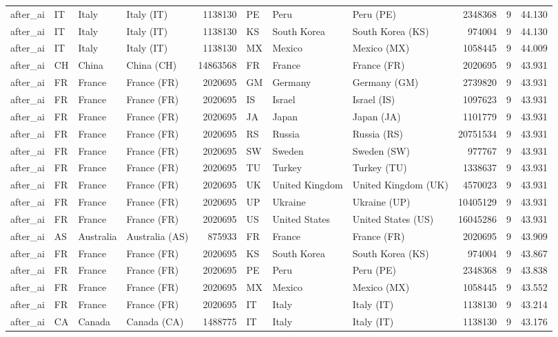 \begin{tabular}{llllrlllrrr}
after\_ai & IT & Italy & Italy (IT) & 1138130 & PE & Peru & Peru (PE) & 2348368 & 9 & 44.130 \\
after\_ai & IT & Italy & Italy (IT) & 1138130 & KS & South Korea & South Korea (KS) & 974004 & 9 & 44.130 \\
after\_ai & IT & Italy & Italy (IT) & 1138130 & MX & Mexico & Mexico (MX) & 1058445 & 9 & 44.009 \\
after\_ai & CH & China & China (CH) & 14863568 & FR & France & France (FR) & 2020695 & 9 & 43.931 \\
after\_ai & FR & France & France (FR) & 2020695 & GM & Germany & Germany (GM) & 2739820 & 9 & 43.931 \\
after\_ai & FR & France & France (FR) & 2020695 & IS & Israel & Israel (IS) & 1097623 & 9 & 43.931 \\
after\_ai & FR & France & France (FR) & 2020695 & JA & Japan & Japan (JA) & 1101779 & 9 & 43.931 \\
after\_ai & FR & France & France (FR) & 2020695 & RS & Russia & Russia (RS) & 20751534 & 9 & 43.931 \\
after\_ai & FR & France & France (FR) & 2020695 & SW & Sweden & Sweden (SW) & 977767 & 9 & 43.931 \\
after\_ai & FR & France & France (FR) & 2020695 & TU & Turkey & Turkey (TU) & 1338637 & 9 & 43.931 \\
after\_ai & FR & France & France (FR) & 2020695 & UK & United Kingdom & United Kingdom (UK) & 4570023 & 9 & 43.931 \\
after\_ai & FR & France & France (FR) & 2020695 & UP & Ukraine & Ukraine (UP) & 10405129 & 9 & 43.931 \\
after\_ai & FR & France & France (FR) & 2020695 & US & United States & United States (US) & 16045286 & 9 & 43.931 \\
after\_ai & AS & Australia & Australia (AS) & 875933 & FR & France & France (FR) & 2020695 & 9 & 43.909 \\
after\_ai & FR & France & France (FR) & 2020695 & KS & South Korea & South Korea (KS) & 974004 & 9 & 43.867 \\
after\_ai & FR & France & France (FR) & 2020695 & PE & Peru & Peru (PE) & 2348368 & 9 & 43.838 \\
after\_ai & FR & France & France (FR) & 2020695 & MX & Mexico & Mexico (MX) & 1058445 & 9 & 43.552 \\
after\_ai & FR & France & France (FR) & 2020695 & IT & Italy & Italy (IT) & 1138130 & 9 & 43.214 \\
after\_ai & CA & Canada & Canada (CA) & 1488775 & IT & Italy & Italy (IT) & 1138130 & 9 & 43.176 \\

\end{tabular}
